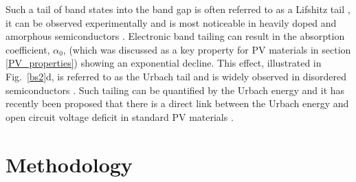 \documentclass[11pt, twoside]{report}
\begin{document}
Such a tail of band states into the band gap is often referred to as a Lifshitz tail \cite{Lifshitz1964}, it can be observed experimentally and is most noticeable in heavily doped and amorphous semiconductors \cite{thin_film_Boer}. 
Electronic band tailing can result in the absorption coefficient, $\alpha_{0}$, (which was discussed as a key property for PV materials in section \ref{PV_properties}) showing an exponential decline. This effect, illustrated in Fig.~\ref{bs2}d, is referred to as the Urbach tail \cite{Urbach1953} and is widely observed in disordered semiconductors \cite{thin_film_Boer}. Such tailing can be quantified by the Urbach energy and it has recently been proposed that there is a direct link between the Urbach energy and open circuit voltage deficit in standard PV materials \cite{culprit, UrbachE_Voc}.


 



\chapter{Methodology}
\end{document}
